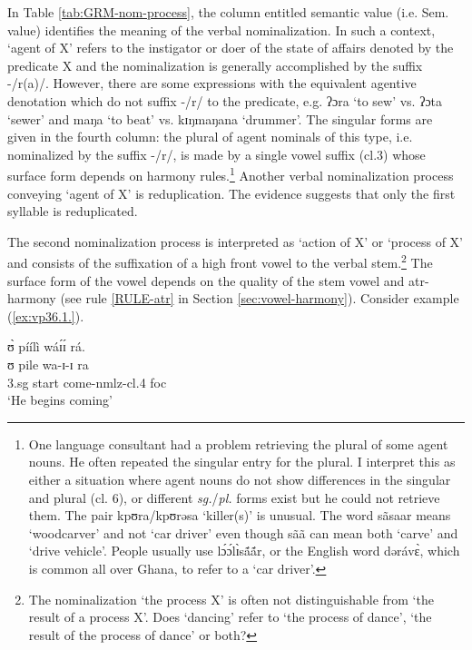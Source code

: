 \begin{exe}
\begin{exe}
\begin{exe}
{\begin{exe}
\begin{exe}
\begin{exe}
\begin{exe}
 In Table \ref{tab:GRM-nom-process}, the column entitled semantic value (i.e.
Sem. value)  identifies the meaning of the verbal nominalization. In such a
context, `agent of X'  refers to the instigator or doer of the state of affairs
denoted by  the predicate X and
the nominalization is generally accomplished by the suffix -/{\sls r(a)}/.  
However,  there are some expressions with the equivalent
agentive denotation which
do
not suffix -/{\sls r}/  to the  predicate, e.g.  {\sls ʔɔra} `to sew' vs.
{\sls ʔɔta} `sewer' and {\sls maŋa} `to beat' vs.  {\sls kɪŋmaŋana} `drummer'.  
The
singular forms  are given in the fourth column: 
the plural of agent nominals  of
this type, i.e. nominalized by the suffix -/{\sls r}/, is made by  a single 
vowel
suffix  ({\sc cl.3}) whose surface
form  depends on harmony rules.\footnote{One language consultant
had a problem retrieving the plural of some agent nouns. He often repeated the
singular entry
for the plural. I interpret this as  either a situation where agent nouns do
not show differences in the singular and plural ({\sc cl. 6}), or different {\it
sg.}/{\it pl.}
forms exist but he could not retrieve them. The pair {\sls kpʊra}/{\sls kpʊrəsa}
`killer(s)'   is unusual.  The word {\sls  sãsaar} means
`woodcarver' and not `car driver'  even though {\sls sãã} can mean both 
`carve'
and `drive vehicle'.  People usually use  {\sls lɔ́ɔ́lɪ̀sã́ã́r}, or the 
English
word {\sls dərávɛ̀}, 
 which is common all over Ghana, to refer to a `car driver'. } Another verbal
nominalization process conveying `agent of X' is reduplication. The evidence
suggests that  only the first syllable  is reduplicated.

The second nominalization process is  interpreted as `action of X' or
`process of X' and
consists of the suffixation of a  high front vowel to the verbal
 stem.\footnote{The nominalization `the process X' is often not distinguishable 
from
`the result of a process X'.  Does `dancing'  refer to `the process of dance', 
`the result of the process of dance' or both?} The surface form of the vowel
depends
on the quality of the stem vowel and {\sc atr}-harmony  (see
rule \ref{RULE-atr} in Section \ref{sec:vowel-harmony}). 
Consider example (\ref{ex:vp36.1.}).


\ea\label{ex:vp36.1.}
\glll ʊ̀ píílì wáɪ́ɪ́ rá.\\
ʊ pile wa-ɪ-ɪ ra\\
  {\sc 3.sg} start come-{\sc nmlz}-{\sc cl.4} {\sc foc}\\
\glt  `He begins coming' 
\z


\end{exe}
\end{exe}
\end{exe}
\end{exe}}
\end{exe}
\end{exe}
\end{exe}
